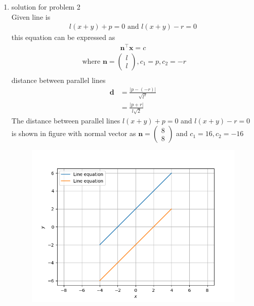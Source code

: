 \documentclass[12pt]{article}
\providecommand{\abs}[1]{\left\vert#1\right\vert}
\newcommand{\myvec}[1]{\ensuremath{\begin{pmatrix}#1\end{pmatrix}}}
\let\vec\mathbf
\begin{document}
\begin{enumerate}
\begin{figure}[h!]
\begin{center}
\end{center}
\caption{}
\label{fig:Fig1}
\end{figure}
	\item solution for problem 2
	\\
Given line is 
\begin{align}
l(x+y)+p=0\text{ and }l(x+y)-r=0
\end{align}
this equation can be expressed as 
\begin{align}
\vec{n}^{\top}\vec{x}=c
\end{align}
\begin{align}
\text{ where }
		\vec{n} = \myvec{l\\l},c_1=p,c_2=-r\\		
\end{align}
distance between parallel lines 
\begin{align}
\vec{d}&=\frac{\abs{p-(-r)}}{\sqrt{l^{2}}}\\
&=\frac{\abs{p+r}}{l\sqrt{2}}
\end{align}	
The distance between parallel lines $l(x+y)+p=0$ and $l(x+y)-r=0 $ is shown in figure with normal vector as $\vec{n}=\myvec{8\\8}$ and $c_1=16,c_2=-16$
\begin{figure}[h!]
\begin{center}
\includegraphics[width=\columnwidth]{para1.png}
\end{center}
\caption{}
\label{fig:Fig2}
\end{figure}
\end{enumerate}
\end{document}
